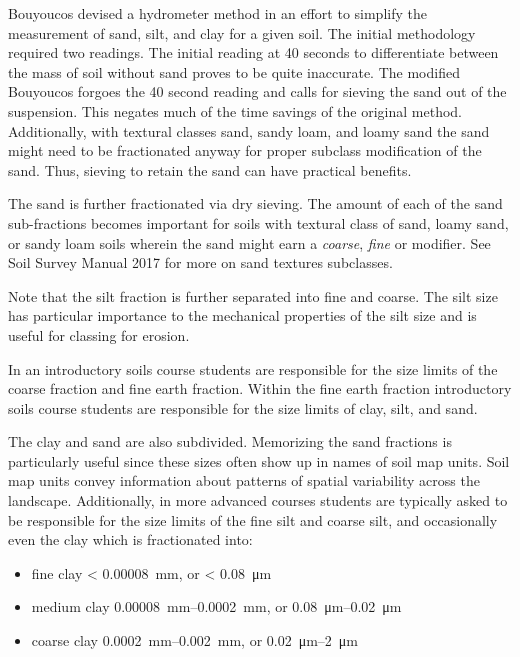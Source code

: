 \documentclass{article}
\begin{document}
Bouyoucos devised a hydrometer method in an effort to simplify the measurement of sand, silt, and clay for a given soil. The initial methodology required two readings. The initial reading at 40 seconds to differentiate between the mass of soil without sand proves to be quite inaccurate. The modified Bouyoucos forgoes the 40 second reading and calls for sieving the sand out of the suspension. This negates much of the time savings of the original method. Additionally, with textural classes sand, sandy loam, and loamy sand the sand might need to be fractionated anyway for proper subclass modification of the sand. Thus, sieving to retain the sand can have practical benefits.

The sand is further fractionated via dry sieving. The amount of each of the sand sub-fractions becomes important for soils with textural class of sand, loamy sand, or sandy loam soils wherein the sand might earn a \textit{coarse}, \textit{fine} or  modifier. See Soil Survey Manual 2017 for more on sand textures subclasses.

Note that the silt fraction is further separated into fine and coarse. The silt size has particular importance to the mechanical properties of the silt size and is useful for classing for erosion.

In an introductory soils course students are responsible for the size limits of the coarse fraction and fine earth fraction. Within the fine earth fraction introductory soils course students are responsible for the size limits of clay, silt, and sand.

The clay and sand are also subdivided. Memorizing the sand fractions is particularly useful since these sizes often show up in names of soil map units. Soil map units convey information about patterns of spatial variability across the landscape. Additionally, in more advanced courses students are typically asked to be responsible for the size limits of the fine silt and coarse silt, and occasionally even the clay which is fractionated into:
    
\begin{itemize}
    \item fine clay \qty{< 0.00008}{mm}, or \qty{< 0.08}{\micro\meter}
    \item medium clay \qtyrange{0.00008}{0.0002}{mm}, or \qtyrange{0.08}{0.02}{\micro\meter}
    \item coarse clay \qtyrange{0.0002}{0.002}{mm}, or \qtyrange{0.02}{2}{\micro\meter}
\end{itemize}
    
\end{document}
